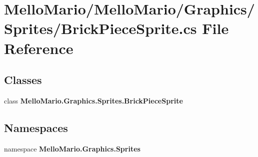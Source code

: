 \section{Mello\+Mario/\+Mello\+Mario/\+Graphics/\+Sprites/\+Brick\+Piece\+Sprite.cs File Reference}
\label{BrickPieceSprite_8cs}
\subsection*{Classes}
\begin{DoxyCompactItemize}
\item 
class \textbf{ Mello\+Mario.\+Graphics.\+Sprites.\+Brick\+Piece\+Sprite}
\end{DoxyCompactItemize}
\subsection*{Namespaces}
\begin{DoxyCompactItemize}
\item 
namespace \textbf{ Mello\+Mario.\+Graphics.\+Sprites}
\end{DoxyCompactItemize}
